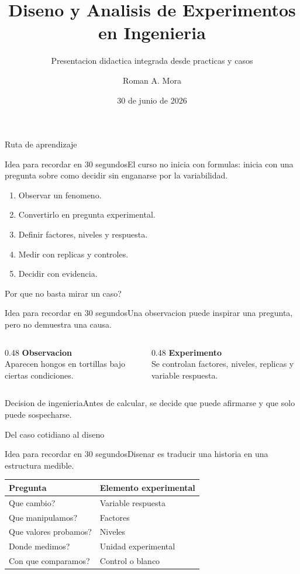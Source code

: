 \documentclass[aspectratio=169,11pt]{beamer}
\title{Diseno y Analisis de Experimentos en Ingenieria}
\subtitle{Presentacion didactica integrada desde practicas y casos}
\author{Roman A. Mora}
\institute{Universidad Autonoma Metropolitana}
\date{30 de junio de 2026}
\newcommand{\idea}[1]{\begin{block}{Idea para recordar en 30 segundos}#1\end{block}}
\newcommand{\decision}[1]{\begin{alertblock}{Decision de ingenieria}#1\end{alertblock}}
\begin{document}
\begin{frame}
  \titlepage
\end{frame}

\begin{frame}{Ruta de aprendizaje}
  \idea{El curso no inicia con formulas: inicia con una pregunta sobre como decidir sin enganarse por la variabilidad.}
  \begin{enumerate}
    \item Observar un fenomeno.
    \item Convertirlo en pregunta experimental.
    \item Definir factores, niveles y respuesta.
    \item Medir con replicas y controles.
    \item Decidir con evidencia.
  \end{enumerate}
\end{frame}

\begin{frame}{Por que no basta mirar un caso?}
  \idea{Una observacion puede inspirar una pregunta, pero no demuestra una causa.}
  \begin{columns}[T]
    \begin{column}{0.48\textwidth}
      \textbf{Observacion}\\
      Aparecen hongos en tortillas bajo ciertas condiciones.
    \end{column}
    \begin{column}{0.48\textwidth}
      \textbf{Experimento}\\
      Se controlan factores, niveles, replicas y variable respuesta.
    \end{column}
  \end{columns}
  \decision{Antes de calcular, se decide que puede afirmarse y que solo puede sospecharse.}
\end{frame}

\begin{frame}{Del caso cotidiano al diseno}
  \idea{Disenar es traducir una historia en una estructura medible.}
  \begin{table}
    \centering
    \begin{tabular}{ll}
      \toprule
      Pregunta & Elemento experimental \\
      \midrule
      Que cambio? & Variable respuesta \\
      Que manipulamos? & Factores \\
      Que valores probamos? & Niveles \\
      Donde medimos? & Unidad experimental \\
      Con que comparamos? & Control o blanco \\
      \bottomrule
    \end{tabular}
  \end{table}
\end{frame}
\end{document}
